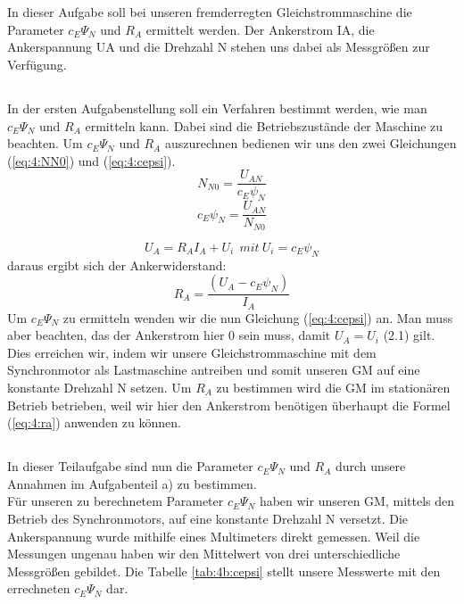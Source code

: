 \chapter{}
In dieser Aufgabe soll bei unseren fremderregten Gleichstrommaschine die Parameter $ c_{E}\Psi_{N} $ und $ R_{A} $  ermittelt werden. Der Ankerstrom IA, die Ankerspannung UA und die Drehzahl N stehen uns dabei als Messgrößen zur Verfügung.
\section{}
In der ersten Aufgabenstellung soll ein Verfahren bestimmt werden, wie man $ c_{E}\Psi_{N} $ und $ R_{A} $ ermitteln kann. Dabei sind die Betriebszustände der Maschine zu beachten. Um $ c_{E}\Psi_{N} $ und $ R_{A} $ auszurechnen bedienen wir uns den zwei Gleichungen (\ref{eq:4:NN0}) und (\ref{eq:4:cepsi}).
\begin{equation}
	N_{N0} = \frac{U_{AN}}{c_{E}\psi_{N}}
	\label{eq:4:NN0}
\end{equation}
\begin{equation}
	c_{E}\psi_{N} = \frac{U_{AN}}{N_{N0}}
	\label{eq:4:cepsi}
\end{equation}

\begin{equation}
	U_{A} = R_{A}I_{A} + U_{i}~~ mit~ U_{i} = c_{E}\psi_{N}
	\label{eq:4:ua}
\end{equation}
daraus ergibt sich der Ankerwiderstand:
\begin{equation}
	R_{A} = \frac{(U_{A} - c_{E}\psi_{N})}{I_{A}}
	\label{eq:4:ra}
\end{equation}
Um $ c_{E}\Psi_{N} $ zu ermitteln wenden wir die nun Gleichung (\ref{eq:4:cepsi}) an. Man muss aber beachten, das der Ankerstrom hier 0 sein muss, damit $ U_{A} = U_{i} $ (2.1) gilt. Dies erreichen wir, indem wir unsere Gleichstrommaschine mit dem Synchronmotor als Lastmaschine antreiben und somit unseren GM auf eine konstante Drehzahl N setzen. Um $ R_{A} $ zu bestimmen wird die GM im stationären Betrieb betrieben, weil wir hier den Ankerstrom benötigen überhaupt die Formel (\ref{eq:4:ra}) anwenden zu können.


\section{}
In dieser Teilaufgabe sind nun die Parameter $ c_{E}\Psi_{N} $ und $ R_{A} $ durch unsere Annahmen im Aufgabenteil a) zu bestimmen.\\
Für unseren zu berechnetem Parameter $ c_{E}\Psi_{N} $ haben wir unseren GM, mittels den Betrieb des Synchronmotors, auf eine konstante Drehzahl N versetzt. Die Ankerspannung wurde mithilfe eines Multimeters direkt gemessen. Weil die Messungen ungenau haben wir den Mittelwert von drei unterschiedliche Messgrößen gebildet. Die Tabelle \ref{tab:4b:cepsi} stellt unsere Messwerte mit den errechneten $ c_{E}\Psi_{N} $ dar.

